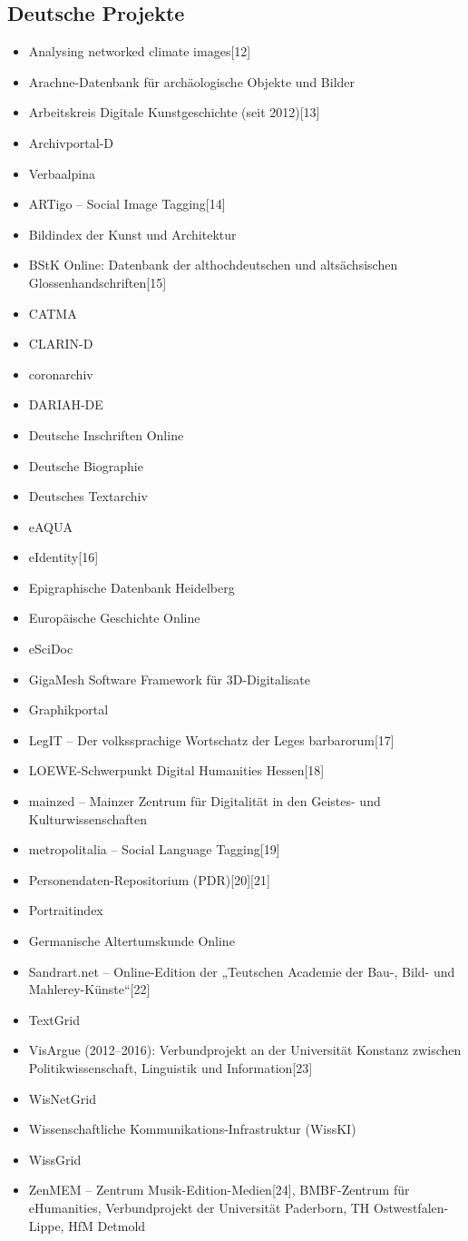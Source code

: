 \documentclass{article}
\begin{document}
\subsection{Deutsche Projekte}
\begin{itemize}
\item Analysing networked climate images[12]
\item Arachne-Datenbank für archäologische Objekte und Bilder
\item Arbeitskreis Digitale Kunstgeschichte (seit 2012)[13]
\item Archivportal-D
\item Verbaalpina
\item ARTigo – Social Image Tagging[14]
\item Bildindex der Kunst und Architektur
\item BStK Online: Datenbank der althochdeutschen und altsächsischen Glossenhandschriften[15]
\item CATMA
\item CLARIN-D
\item coronarchiv
\item DARIAH-DE
\item Deutsche Inschriften Online
\item Deutsche Biographie
\item Deutsches Textarchiv
\item eAQUA
\item eIdentity[16]
\item Epigraphische Datenbank Heidelberg
\item Europäische Geschichte Online
\item eSciDoc
\item GigaMesh Software Framework für 3D-Digitalisate
\item Graphikportal
\item LegIT – Der volkssprachige Wortschatz der Leges barbarorum[17]
\item LOEWE-Schwerpunkt Digital Humanities Hessen[18]
\item mainzed – Mainzer Zentrum für Digitalität in den Geistes- und Kulturwissenschaften
\item metropolitalia – Social Language Tagging[19]
\item Personendaten-Repositorium (PDR)[20][21]
\item Portraitindex
\item Germanische Altertumskunde Online
\item Sandrart.net – Online-Edition der „Teutschen Academie der Bau-, Bild- und Mahlerey-Künste“[22]
\item TextGrid
\item VisArgue (2012–2016): Verbundprojekt an der Universität Konstanz zwischen Politikwissenschaft, Linguistik und Information[23]
\item WisNetGrid
\item Wissenschaftliche Kommunikations-Infrastruktur (WissKI)
\item WissGrid
\item ZenMEM – Zentrum Musik-Edition-Medien[24], BMBF-Zentrum für eHumanities, Verbundprojekt der Universität Paderborn, TH Ostwestfalen-Lippe, HfM Detmold
\end{itemize}
\end{document}
